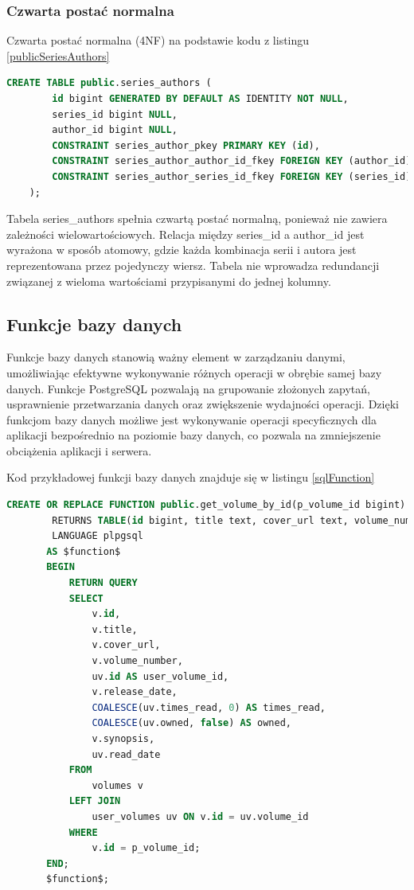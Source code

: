\documentclass[12pt,twoside]{article}
\begin{document}
\subsubsection{Czwarta postać normalna}

Czwarta postać normalna (4NF) na podstawie kodu z listingu \ref{publicSeriesAuthors}
	\begin{lstlisting}[language=SQL,caption=kod tworzenia tabeli series\_authors, label={publicSeriesAuthors}]
		CREATE TABLE public.series_authors (
		id bigint GENERATED BY DEFAULT AS IDENTITY NOT NULL,
		series_id bigint NULL,
		author_id bigint NULL,
		CONSTRAINT series_author_pkey PRIMARY KEY (id),
		CONSTRAINT series_author_author_id_fkey FOREIGN KEY (author_id) REFERENCES authors(id) ON UPDATE CASCADE ON DELETE CASCADE,
		CONSTRAINT series_author_series_id_fkey FOREIGN KEY (series_id) REFERENCES series(id) ON UPDATE CASCADE ON DELETE CASCADE
	);
\end{lstlisting}
Tabela series\_authors spełnia czwartą postać normalną, ponieważ nie zawiera zależności wielowartościowych. Relacja 
między series\_id a author\_id jest wyrażona w sposób atomowy, gdzie każda kombinacja serii i autora jest 
reprezentowana przez pojedynczy wiersz. Tabela nie wprowadza redundancji związanej z wieloma wartościami 
przypisanymi do jednej kolumny.

\subsection{Funkcje bazy danych}

Funkcje bazy danych stanowią ważny element w zarządzaniu danymi, umożliwiając efektywne wykonywanie różnych operacji 
w obrębie samej bazy danych. Funkcje PostgreSQL pozwalają na grupowanie złożonych zapytań, usprawnienie przetwarzania 
danych oraz zwiększenie wydajności operacji. Dzięki funkcjom bazy danych możliwe jest wykonywanie operacji 
specyficznych dla aplikacji bezpośrednio na poziomie bazy danych, co pozwala na zmniejszenie obciążenia aplikacji i 
serwera.

Kod przykładowej funkcji bazy danych znajduje się w listingu \ref{sqlFunction}

	\begin{lstlisting}[language=SQL,caption=kod funkcji get\_volume\_by\_id, label={sqlFunction}]
		CREATE OR REPLACE FUNCTION public.get_volume_by_id(p_volume_id bigint)
		RETURNS TABLE(id bigint, title text, cover_url text, volume_number smallint, user_volume_id bigint, release_date timestamp with time zone, times_read smallint, owned boolean, synopsis text, read_date timestamp with time zone)
		LANGUAGE plpgsql
	   AS $function$
	   BEGIN
		   RETURN QUERY
		   SELECT 
			   v.id,
			   v.title,
			   v.cover_url,
			   v.volume_number,
			   uv.id AS user_volume_id,
			   v.release_date,
			   COALESCE(uv.times_read, 0) AS times_read,
			   COALESCE(uv.owned, false) AS owned,
			   v.synopsis,
			   uv.read_date
		   FROM 
			   volumes v
		   LEFT JOIN 
			   user_volumes uv ON v.id = uv.volume_id
		   WHERE 
			   v.id = p_volume_id;
	   END;
	   $function$;
	\end{lstlisting}
\end{document}
